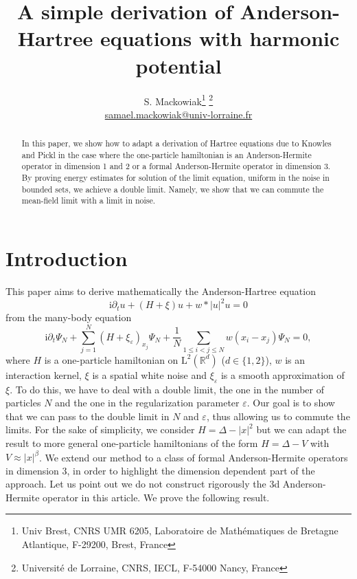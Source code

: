 \documentclass{article}
\title{A simple derivation of Anderson-Hartree equations with harmonic potential}
\author{S. Mackowiak\thanks{Univ Brest,  CNRS UMR 6205,  Laboratoire de Mathématiques de Bretagne Atlantique,  F-29200,  Brest,  France} \thanks{Université de Lorraine,  CNRS,  IECL,  F-54000 Nancy,  France}\\
\href{mailto:samael.mackowiak@univ-lorraine.fr}{samael.mackowiak@univ-lorraine.fr}}
\date{}
\def\R{\mathbb R}
\def\L{\mathrm L}
\def\eps{\varepsilon}
\def \p {\partial}
\theoremstyle{definition}
\numberwithin{equation}{section}
\newcommand{\complexI}{\mathrm{i}} %
\begin{document}
\maketitle

\begin{abstract}

    In this paper, we show how to adapt a derivation of Hartree equations due to Knowles and Pickl in the case where the one-particle hamiltonian is an Anderson-Hermite operator in dimension 1 and 2 or a formal Anderson-Hermite operator in dimension 3. By proving energy estimates for solution of the limit equation, uniform in the noise in bounded sets, we achieve a double limit. Namely, we show that we can commute the mean-field limit with a limit in noise.
    
\end{abstract}

\section{Introduction}

This paper aims to derive mathematically the Anderson-Hartree equation
\begin{equation}\label{Intro:AndersonHartreeEq}
    \complexI\p_t u +(H+\xi) u + w*|u|^2 u = 0
\end{equation}
from the many-body equation
\begin{equation}\label{Intro:ManyBodyEq}
    \complexI\p_t\Psi_N + \sum_{j=1}^N (H+\xi_\eps)_{x_j}\Psi_N + \frac{1}{N}\sum_{1\leqslant i<j\leqslant N}w(x_i-x_j)\Psi_N = 0,
\end{equation}
where $H$ is a one-particle hamiltonian on $\L^2(\R^d)$ ($d\in\{1,2\}$), $w$ is an interaction kernel, $\xi$ is a spatial white noise and $\xi_\eps$ is a smooth approximation of $\xi$. To do this, we have to deal with a double limit, the one in the number of particles $N$ and the one in the regularization parameter $\eps$. Our goal is to show that we can pass to the double limit in $N$ and $\eps$, thus allowing us to commute the limits. For the sake of simplicity, we consider $H=\Delta-|x|^2$ but we can adapt the result to more general one-particle hamiltonians of the form $H=\Delta-V$ with $V\approx |x|^\beta$. We extend our method to a class of formal Anderson-Hermite operators in dimension 3, in order to highlight the dimension dependent part of the approach. Let us point out we do not construct rigorously the 3d Anderson-Hermite operator in this article. We prove the following result. 
\end{document}
